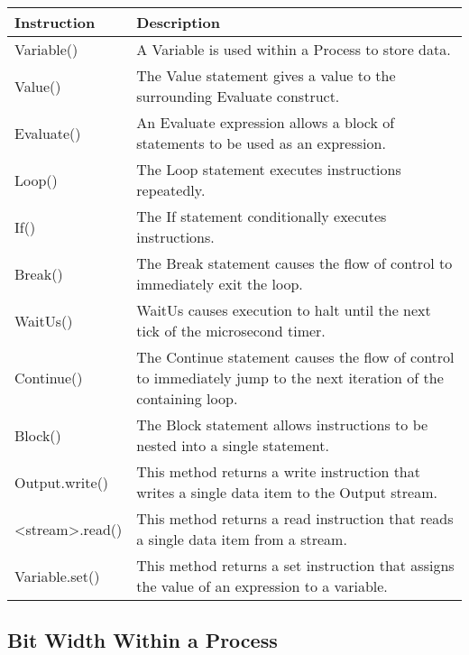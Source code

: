 \documentclass[letterpaper,10pt,english]{manual}
\begin{document}
\begin{tabulary}{\textwidth}{|L|L|}
\hline
\textbf{
Instruction
} & \textbf{
Description
}\\
\hline

Variable()
 & 
A Variable is used within a Process to store data.
\\

Value()
 & 
The Value statement gives a value to the surrounding
Evaluate construct.
\\

Evaluate()
 & 
An Evaluate  expression allows a block of statements
to be used as an expression.
\\

Loop()
 & 
The Loop statement executes instructions repeatedly.
\\

If()
 & 
The If statement conditionally executes
instructions.
\\

Break()
 & 
The Break statement causes the flow of control to
immediately exit the loop.
\\

WaitUs()
 & 
WaitUs causes execution to halt until the next tick
of the microsecond timer.
\\

Continue()
 & 
The Continue statement causes the flow of control to
immediately jump to the next iteration of the
containing loop.
\\

Block()
 & 
The Block statement allows instructions to be nested
into a single statement.
\\

Output.write()
 & 
This method returns a write instruction that writes a
single data item to the Output stream.
\\

\textless{}stream\textgreater{}.read()
 & 
This method returns a read instruction that reads a
single data item from a  stream.
\\

Variable.set()
 & 
This method returns a set instruction that assigns the
value of an expression to a variable.
\\
\hline
\end{tabulary}



\subsection{Bit Width Within a Process}
\end{document}
